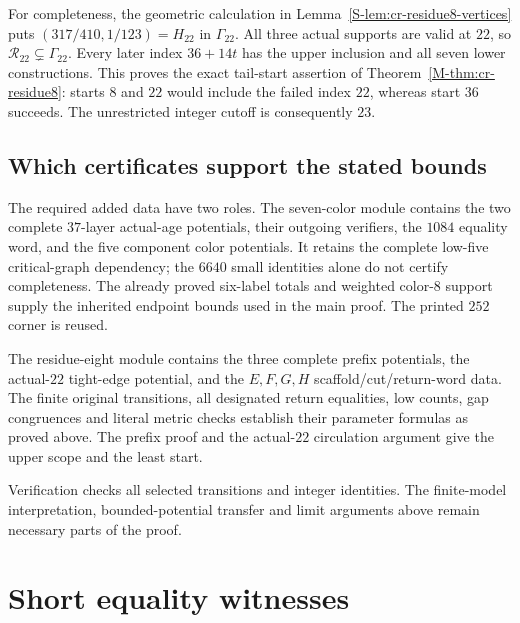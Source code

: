 \documentclass[11pt,reqno]{amsart}
\theoremstyle{plain}
\theoremstyle{plain}
\theoremstyle{plain}
\begin{document}
For completeness, the geometric calculation in
Lemma~\ref{S-lem:cr-residue8-vertices} puts
$(317/410,1/123)=H_{22}$ in $\Gamma_{22}$. All three actual
supports are valid at $22$, so
$\mathcal R_{22}\subsetneq\Gamma_{22}$. Every later index
$36+14t$ has the upper inclusion and all seven lower
constructions. This proves the exact tail-start assertion
of Theorem~\ref*{M-thm:cr-residue8}: starts $8$ and $22$ would
include the failed index $22$, whereas start $36$ succeeds.
The unrestricted integer cutoff is consequently $23$.

\subsection{Which certificates support the stated bounds}
\label{S-supp:cr-proof-roles}

The required added data have two roles. The seven-color
module contains the two complete $37$-layer actual-age
potentials, their outgoing verifiers, the $1084$ equality
word, and the five component color potentials. It retains
the complete low-five critical-graph dependency; the $6640$
small identities alone do not certify completeness. The
already proved six-label totals and weighted color-$8$
support supply the inherited endpoint bounds used in the
main proof. The printed $252$ corner is reused.

The residue-eight module contains the three complete prefix
potentials, the actual-$22$ tight-edge potential, and the
$E,F,G,H$ scaffold/cut/return-word data. The finite original
transitions, all designated return equalities, low counts,
gap congruences and literal metric checks establish their
parameter formulas as proved above. The prefix proof and
the actual-$22$ circulation argument give the upper scope
and the least start.

Verification checks all selected transitions and integer identities.
The finite-model interpretation, bounded-potential transfer and limit
arguments above remain necessary parts of the proof.

\section{Short equality witnesses}\label{S-supp:short-witnesses}
\end{document}
